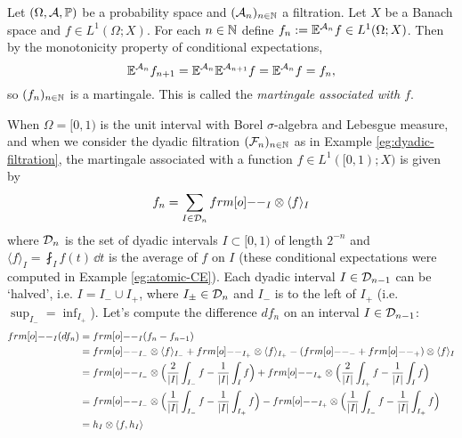 \begin{example}
  Let $(\Omega, \mathcal{A}, \mathbb{P})$ be a probability space and $(\mathcal{A}_n)_{n \in \mathbb{N}}$ a filtration.
  Let $X$ be a Banach space and $f \in L^1(\Omega;X)$.
  For each $n \in \mathbb{N}$ define $f_n := \mathbb{E}^{\mathcal{A}_n}f \in L^1(\Omega;X)$.
  Then by the monotonicity property of conditional expectations,
  \begin{equation*}
    \mathbb{E}^{\mathcal{A}_n} f_{n+1} = \mathbb{E}^{\mathcal{A}_n} \mathbb{E}^{\mathcal{A}_{n+1}} f = \mathbb{E}^{\mathcal{A}_n} f = f_n,
  \end{equation*}
  so $(f_n)_{n \in \mathbb{N}}$ is a martingale.
  This is called the \emph{martingale associated with $f$}.

  When $\Omega = [0,1)$ is the unit interval with Borel $\sigma$-algebra and Lebesgue measure, and when we consider the dyadic filtration $(\mathcal{F}_n)_{n \in \mathbb{N}}$ as in Example \ref{eg:dyadic-filtration}, the martingale associated with a function $f \in L^1([0,1);X)$ is given by
  \begin{equation*}
    f_n = \sum_{I \in \mc{D}_n} \1_I \otimes \langle f \rangle_I
  \end{equation*}
  where $\mathcal{D}_n$ is the set of dyadic intervals $I \subset [0,1)$ of length $2^{-n}$ and $\langle f \rangle_I = \fint_I f(t) \, \dd t$ is the average of $f$ on $I$ (these conditional expectations were computed in Example \ref{eg:atomic-CE}).
  Each dyadic interval $I \in \mathcal{D}_{n-1}$ can be `halved', i.e. $I = I_{-} \cup I_{+}$, where $I_{\pm} \in \mathcal{D}_{n}$ and $I_-$ is to the left of $I_+$ (i.e. $\sup_{I_-} = \inf_{I_+}$).
  Let's compute the difference $df_n$ on an interval $I \in \mathcal{D}_{n-1}$:
  \begin{equation*}
    \begin{aligned}
      \1_{I}(df_{n}) &= \1_{I}(f_{n} - f_{n-1}) \\
      &= \1_{I_{-}} \otimes \langle f \rangle_{I_{-}} + \1_{I_{+}} \otimes \langle f \rangle_{I_{+}} - (\1_{-} + \1_{+}) \otimes \langle f \rangle_{I} \\
      &= \1_{I_{-}} \otimes \Big( \frac{2}{|I|}\int_{I_{-}} f - \frac{1}{|I|}\int_{I} f \Big) + \1_{I_{+}} \otimes \Big( \frac{2}{|I|}\int_{I_{+}} f - \frac{1}{|I|}\int_{I} f \Big) \\
      &= \1_{I_{-}} \otimes \Big( \frac{1}{|I|}\int_{I_{-}} f - \frac{1}{|I|}\int_{I_{+}} f \Big) - \1_{I_{+}} \otimes \Big( \frac{1}{|I|}\int_{I_{-}} f - \frac{1}{|I|}\int_{I_{+}} f \Big) \\
      &= h_I \otimes \langle f, h_I \rangle
    \end{aligned}

\end{equation*}
\end{example}
